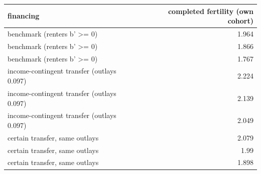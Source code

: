 \begin{tabular}{lr}
\toprule
financing & completed fertility (own cohort) \\
\midrule
benchmark (renters b' >= 0) & 1.964 \\
benchmark (renters b' >= 0) & 1.866 \\
benchmark (renters b' >= 0) & 1.767 \\
income-contingent transfer (outlays 0.097) & 2.224 \\
income-contingent transfer (outlays 0.097) & 2.139 \\
income-contingent transfer (outlays 0.097) & 2.049 \\
certain transfer, same outlays & 2.079 \\
certain transfer, same outlays & 1.99 \\
certain transfer, same outlays & 1.898 \\
\bottomrule
\end{tabular}

